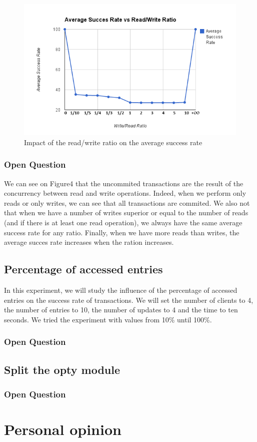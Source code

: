 \documentclass[a4paper, 11pt]{article}
\begin{document}
\begin{figure}[H]
\begin{center}
\includegraphics[scale=0.5]{exp4.png}
\caption{Impact of the read/write ratio on the average success rate}
\end{center}
\end{figure}

\subsubsection{Open Question}
We can see on Figure4 that the uncommited transactions are the result of the concurrency between read and write operations. Indeed, when we perform only reads or only writes, we can see that all transactions are commited. We also not that when we have a number of writes superior or equal to the number of reads (and if there is at least one read operation), we always have the same average success rate for any ratio. Finally, when we have more reads than writes, the average succes rate increases when the ration increases.

\subsection{Percentage of accessed entries}
In this experiment, we will study the influence of the percentage of accessed entries on the success rate of transactions. We will set the number of clients to 4, the number of entries to 10, the number of updates to 4 and the time to ten seconds. We tried the experiment with values from 10\% until 100\%.


\subsubsection{Open Question}

\subsection{Split the opty module}

\subsubsection{Open Question}

\section{Personal opinion}
\end{document}
